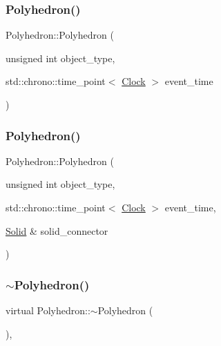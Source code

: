 \mbox{\label{classPolyhedron_a29a4fff595cdb6a557e5f62255e61192}} 
\subsubsection{\texorpdfstring{Polyhedron()}{Polyhedron()}\hspace{0.1cm}{\footnotesize\ttfamily [3/4]}}
{\footnotesize\ttfamily Polyhedron\+::\+Polyhedron (\begin{DoxyParamCaption}\item[{unsigned int}]{object\+\_\+type,  }\item[{std\+::chrono\+::time\+\_\+point$<$ \mbox{\hyperlink{universe_8h_a0ef8d951d1ca5ab3cfaf7ab4c7a6fd80}{Clock}} $>$}]{event\+\_\+time }\end{DoxyParamCaption})\hspace{0.3cm}{\ttfamily [inline]}}

\mbox{\label{classPolyhedron_af5bb1d2a6b04502dfdbfc9f04aafc950}} 
\subsubsection{\texorpdfstring{Polyhedron()}{Polyhedron()}\hspace{0.1cm}{\footnotesize\ttfamily [4/4]}}
{\footnotesize\ttfamily Polyhedron\+::\+Polyhedron (\begin{DoxyParamCaption}\item[{unsigned int}]{object\+\_\+type,  }\item[{std\+::chrono\+::time\+\_\+point$<$ \mbox{\hyperlink{universe_8h_a0ef8d951d1ca5ab3cfaf7ab4c7a6fd80}{Clock}} $>$}]{event\+\_\+time,  }\item[{\mbox{\hyperlink{classSolid}{Solid}} \&}]{solid\+\_\+connector }\end{DoxyParamCaption})\hspace{0.3cm}{\ttfamily [inline]}}

\mbox{\label{classPolyhedron_a3ad3df8be901a55ddcd97128ac890473}} 
\subsubsection{\texorpdfstring{$\sim$\+Polyhedron()}{~Polyhedron()}}
{\footnotesize\ttfamily virtual Polyhedron\+::$\sim$\+Polyhedron (\begin{DoxyParamCaption}{ }\end{DoxyParamCaption})\hspace{0.3cm}{\ttfamily [inline]}, {\ttfamily [virtual]}}



